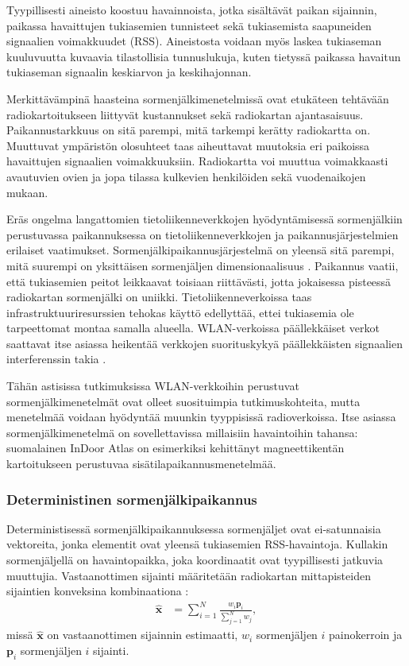 Tyypillisesti aineisto koostuu havainnoista, jotka sisältävät paikan sijainnin,
paikassa havaittujen tukiasemien tunnisteet sekä tukiasemista saapuneiden
signaalien voimakkuudet (RSS). Aineistosta voidaan myös laskea tukiaseman
kuuluvuutta kuvaavia tilastollisia tunnuslukuja, kuten tietyssä paikassa
havaitun tukiaseman signaalin keskiarvon ja keskihajonnan.

Merkittävämpinä haasteina sormenjälkimenetelmissä ovat etukäteen tehtävään
radiokartoitukseen liittyvät kustannukset sekä radiokartan ajantasaisuus.
Paikannustarkkuus on sitä parempi, mitä tarkempi kerätty radiokartta on.
Muuttuvat ympäristön olosuhteet taas aiheuttavat muutoksia
eri paikoissa havaittujen signaalien voimakkuuksiin. Radiokartta voi
muuttua voimakkaasti avautuvien ovien ja jopa tilassa kulkevien henkilöiden
sekä vuodenaikojen mukaan.

Eräs ongelma langattomien tietoliikenneverkkojen hyödyntämisessä
sormenjälkiin perustuvassa paikannuksessa on tietoliikenneverkkojen
ja paikannusjärjestelmien erilaiset vaatimukset.
Sormenjälkipaikannusjärjestelmä on yleensä sitä parempi, mitä suurempi
on yksittäisen sormenjäljen dimensionaalisuus \cite{harle2013}. Paikannus vaatii,
että tukiasemien peitot leikkaavat toisiaan riittävästi, jotta jokaisessa
pisteessä radiokartan sormenjälki on uniikki. Tietoliikenneverkoissa taas
infrastruktuuriresurssien tehokas käyttö edellyttää, ettei tukiasemia
ole tarpeettomat montaa samalla alueella. WLAN-verkoissa päällekkäiset
verkot saattavat itse asiassa heikentää verkkojen suorituskykyä päällekkäisten
signaalien interferenssin takia \cite{ergin2007}.

Tähän astisissa tutkimuksissa WLAN-verkkoihin perustuvat sormenjälkimenetelmät
ovat olleet suosituimpia tutkimuskohteita, mutta menetelmää voidaan hyödyntää
muunkin tyyppisissä
radioverkoissa. Itse asiassa sormenjälkimenetelmä on sovellettavissa
millaisiin havaintoihin tahansa: suomalainen InDoor Atlas on
esimerkiksi kehittänyt magneettikentän kartoitukseen perustuvaa
sisätilapaikannusmenetelmää.

\subsubsection{Deterministinen sormenjälkipaikannus}

Deterministisessä sormenjälkipaikannuksessa sormenjäljet ovat
ei-satunnaisia vektoreita, jonka elementit ovat yleensä
tukiasemien RSS-havaintoja. Kullakin sormenjäljellä on havaintopaikka,
joka koordinaatit ovat tyypillisesti jatkuvia muuttujia.
Vastaanottimen sijainti määritetään
radiokartan mittapisteiden sijaintien konveksina kombinaationa 
\cite{honkavirta2009}:
\begin{align}
  \mathbf{\hat{x}} &= \sum_{i=1}^N \frac{w_i \mathbf{p}_i}{\sum_{j=1}^N w_j},
\end{align}
missä $\mathbf{\hat{x}}$ on vastaanottimen sijainnin estimaatti,
$w_i$ sormenjäljen $i$ painokerroin ja $\mathbf{p}_i$ sormenjäljen $i$
sijainti.

